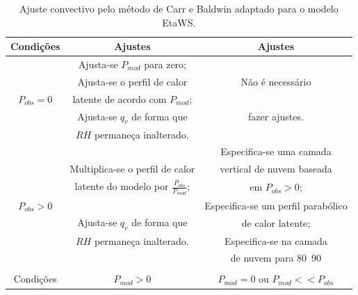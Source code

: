 \begin{table}
\caption{Ajuste convectivo pelo método de Carr e Baldwin adaptado para o modelo EtaWS.}
\label{tab02}
\centering
\begin{tabular}{c|c|c}
\hline
Condições & Ajustes                    & Ajustes                                    \\
\hline
            & Ajusta-se $P_{mod}$ para zero;   &                                            \\
            & Ajusta-se o perfil de calor      & Não é necessário               \\
$P_{obs}=0$ & latente de acordo com $P_{mod}$; &                                            \\
            & Ajusta-se $q_{v}$ de forma que   & fazer ajustes.                             \\
            & $RH$ permaneça inalterado.   &                                            \\
\hline
            &                                  & Especifica-se uma camada                   \\
            & Multiplica-se o perfil de calor  & vertical de nuvem baseada  \\
            & latente do modelo por $\frac{P_{obs}}{P_{mod}}$; & em $P_{obs}>0$;            \\
$P_{obs}>0$ &                                  & Especifica-se um perfil parabólico     \\
            & Ajusta-se $q_{v}$ de forma que   & de calor latente;                          \\
            &  $RH$ permaneça inalterado.  & Especifica-se  na camada                   \\ 
            &                                  & de nuvem para 80~90\\\\%
\hline
Condições &        $P_{mod}>0$               & $P_{mod}=0$ ou $P_{mod}<<P_{obs}$    \\
\hline
\end{tabular}
\end{table}

